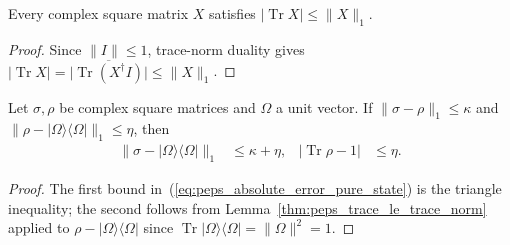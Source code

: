 \begin{lemma}
    \label{thm:peps_trace_le_trace_norm}
    \leanok
    Every complex square matrix $X$ satisfies
    $\lvert\operatorname{Tr}X\rvert\le\|X\|_1$.
\end{lemma}
\begin{proof}
    \leanok
    Since $\|I\|\le 1$, trace-norm duality gives
    $\lvert\operatorname{Tr}X\rvert=\lvert\overline{\operatorname{Tr}(X^\dagger I)}\rvert\le\|X\|_1$.
\end{proof}

\begin{lemma}
    \label{thm:peps_absolute_error_pure_state}
    \leanok
    Let $\sigma,\rho$ be complex square matrices and $\Omega$ a unit vector.
    If $\|\sigma-\rho\|_1\le\kappa$ and
    $\|\rho-|\Omega\rangle\langle\Omega|\|_1\le\eta$, then
    \begin{align}
        \|\sigma-|\Omega\rangle\langle\Omega|\|_1 & \le\kappa+\eta, &
        \lvert\operatorname{Tr}\rho-1\rvert       & \le\eta.
        \label{eq:peps_absolute_error_pure_state}
    \end{align}
\end{lemma}
\begin{proof}
    \leanok
    The first bound in~(\ref{eq:peps_absolute_error_pure_state}) is the triangle
    inequality; the second follows from Lemma~\ref{thm:peps_trace_le_trace_norm}
    applied to $\rho-|\Omega\rangle\langle\Omega|$ since
    $\operatorname{Tr}|\Omega\rangle\langle\Omega|=\|\Omega\|^2=1$.
\end{proof}

